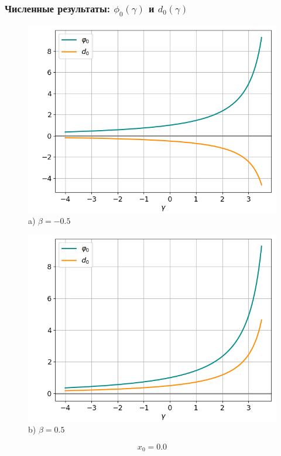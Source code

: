\documentclass[fullscreen=true, unicode, bookmarks=false]{beamer}
\begin{document}
\begin{frame}
\frametitle{ Численные результаты: $ \phi_0(\gamma) $ и $ d_0(\gamma) $ }

\begin{figure} 
\begin{minipage}[h]{0.49\linewidth}
\begin{center}
\includegraphics[scale=0.38]{divergent_phi0d0_x0=0,0,beta=-0,5.png} \\ {\scriptsize a) $ \beta = -0.5 $}
\end{center}
\end{minipage} 
\hfill
\begin{minipage}[h]{0.49\linewidth}
\begin{center}
\includegraphics[scale=0.38]{divergent_phi0d0_x0=0,0,beta=0,5.png}  \\ {\scriptsize b) $ \beta = 0.5 $}
\end{center}
\end{minipage} 
\end{figure}

$$ x_0 = 0.0 $$

\end{frame}
\end{document}

